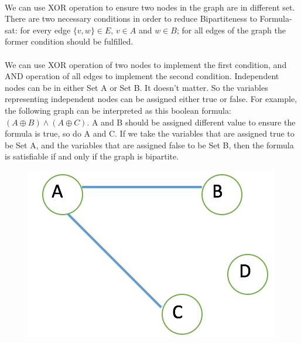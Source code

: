 \begin{problem}{1} ~\\
We can use XOR operation to ensure two nodes in the graph are in different set. There are two necessary conditions in order to reduce Bipartiteness to Formula-sat: for every edge $\{v,w\} \in E$, $v \in A$ and $w \in B$; for all edges of the graph the former condition should be fulfilled. \\
\\
We can use XOR operation of two nodes to implement the first condition, and AND operation of all edges to implement the second condition. Independent nodes can be in either Set A or Set B. It doesn't matter. So the variables representing independent nodes can be assigned either true or false.  For example, the following graph can be interpreted as this boolean formula: $(A \oplus B) \wedge (A \oplus C)$. A and B should be assigned different value to ensure the formula is true, so do A and C. If we take the variables that are assigned true to be Set A, and the variables that are assigned false to be Set B, then the formula is satisfiable if and only if the graph is bipartite. \\

\begin{figure}[H] 
\centering \includegraphics[width=0.4\columnwidth]{1_1}
\end{figure}

\end{problem}